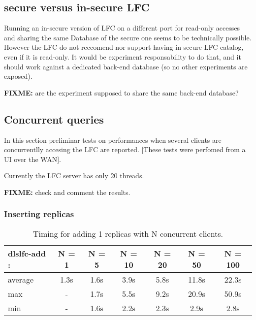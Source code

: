 \documentclass[pdftex]{cmspaper}
\begin{document}
\subsection{secure versus in-secure LFC}

Running an in-secure version of LFC on a different port for read-only accesses
and sharing the same Database of the secure one seems to be technically possible.
However the LFC do not reccomend nor support having in-secure LFC catalog,
even if it is read-only. It would be experiment responsability to do that, and it 
should work against a dedicated back-end database (so no other experiments are exposed).

{\bf FIXME: } are the experiment supposed to share the same back-end database?


\subsection{ Concurrent queries }
 
In this section preliminar tests on performances when several clients 
are concurrentlly accesing the LFC are reported.
[These tests were perfomed from a UI over the WAN].

Currently the LFC server has only 20 threads.

{\bf FIXME:} check and comment the results.  

\subsubsection{ Inserting replicas}


\begin{table}[!htbp]
\begin{center}
 \begin{tabular}{|l|c|c|c|c|c|c|}         \hline
 {\bf dlslfc-add} : & N = 1  & N  = 5  & N = 10 & N = 20 & N = 50 & N = 100 \\ \hline
  average & 1.3s & 1.6s & 3.9s &  5.8s &  11.8s  & 22.3s \\ \hline
  max     & - & 1.7s & 5.5s &  9.2s & 20.9s &  50.9s \\ \hline
  min     &  - &  1.6s & 2.2s  & 2.3s & 2.9s  & 2.8s \\ \hline
\end{tabular}
\caption {Timing for adding 1 replicas with N concurrent clients.}\label{dlslfc-add}
\end{center}
\end{table}
\end{document}
